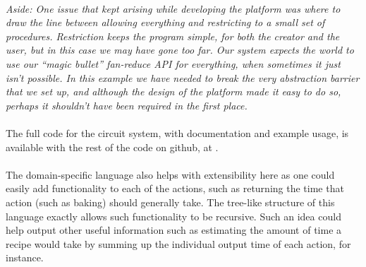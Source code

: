 \paragraph{}
\textit{Aside: One issue that kept arising while developing the platform was where to draw the line between allowing everything and restricting to a small set of procedures. Restriction keeps the program simple, for both the creator and the user, but in this case we may have gone too far. Our system expects the world to use our ``magic bullet'' fan-reduce API for everything, when sometimes it just isn't possible. In this example we have needed to break the very abstraction barrier that we set up, and although the design of the platform made it easy to do so, perhaps it shouldn't have been required in the first place.}

\paragraph{}
The full code for the circuit system, with documentation and example usage, is available with the rest of the code on github, at .

\paragraph{}
The domain-specific language also helps with extensibility here as one could easily add functionality to each of the actions, such as returning the time that action (such as baking) should generally take. The tree-like structure of this language exactly allows such functionality to be recursive. Such an idea could help output other useful information such as estimating the amount of time a recipe would take by summing up the individual output time of each action, for instance.

